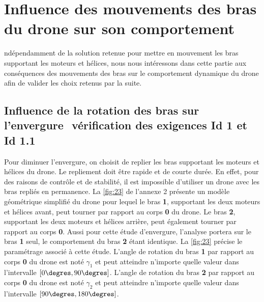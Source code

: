\section{\label{sec:01} Influence des mouvements des bras du drone sur son comportement}

ndépendamment de la solution retenue pour mettre en mouvement les bras supportant les
moteurs et hélices, nous nous intéressons dans cette partie aux conséquences des mouvements des bras sur le comportement dynamique du drone afin de valider les choix retenus
par la suite.

\subsection{Influence de la rotation des bras sur l’envergure ­ vérification des exigences Id 1
et Id 1.1}

Pour diminuer l’envergure, on choisit de replier les bras supportant les moteurs et hélices du
drone. Le repliement doit être rapide et de courte durée. En effet, pour des raisons de contrôle
et de stabilité, il est impossible d’utiliser un drone avec les bras repliés en permanence. La
\autoref{fig:23} de l’annexe 2 présente un modèle géométrique simplifié du drone pour lequel le
bras \textbf{1}, supportant les deux moteurs et hélices avant, peut tourner par rapport au corps \textbf{0} du
drone. Le bras \textbf{2}, supportant les deux moteurs et hélices arrière, peut également tourner par
rapport au corps \textbf{0}. Aussi pour cette étude d’envergure, l’analyse portera sur le bras \textbf{1} seul,
le comportement du bras \textbf{2} étant identique. La \autoref{fig:23} précise le paramétrage associé à
cette étude. L’angle de rotation du bras \textbf{1} par rapport au corps \textbf{0} du drone est noté $\gamma_1$ et peut
atteindre n’importe quelle valeur dans l’intervalle $[0\degres, 90\degres]$.
L’angle de rotation du bras \textbf{2} par rapport au corps \textbf{0} du drone est noté $\gamma_2$ et peut atteindre
n’importe quelle valeur dans l’intervalle $[90\degres, 180\degres]$.

\ifprof
\begin{corrige}
\end{corrige}
\else
\fi

\ifprof
\begin{corrige}
\end{corrige}
\else
\fi


